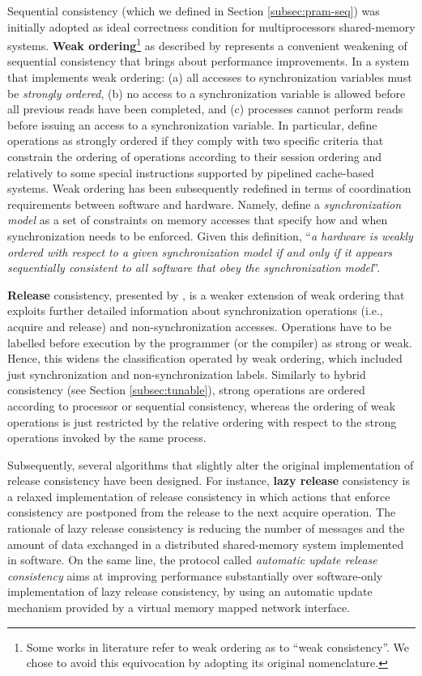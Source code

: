 \documentclass[letter, 11pt]{article}
\newcommand{\citeN}{\citet}
\renewcommand{\cite}{\citep}
\begin{document}
Sequential consistency \cite{Lamport:79} (which we defined in Section \ref{subsec:pram-seq})
was initially adopted as ideal correctness condition for multiprocessors shared-memory systems.
\textbf{Weak ordering}\footnote{Some works in literature refer to weak ordering as to ``weak consistency''. 
We chose to avoid this equivocation by adopting its original nomenclature.}
as described by \citeN{Dubois.Scheurich.ea:86} represents a convenient weakening
of sequential consistency that brings about performance improvements.
In a system that implements weak ordering: 
(a) all accesses to synchronization variables must be \emph{strongly ordered}, 
(b) no access to a synchronization variable is allowed before all previous reads have been completed, and 
(c) processes cannot perform reads before issuing an access to a 
synchronization variable.
In particular, \citeN{Dubois.Scheurich.ea:86} define operations as
strongly ordered if they comply with two specific criteria that constrain 
the ordering of operations according to their session ordering and
relatively to some special instructions supported by pipelined cache-based systems.
Weak ordering has been subsequently redefined in terms of coordination requirements between software and hardware.
Namely, \citeN{Adve.Hill:90} define a \emph{synchronization model}
as a set of constraints on memory accesses that specify how and when synchronization needs to be enforced.
Given this definition,
``\emph{a hardware is weakly ordered with respect to a given synchronization 
model if and only if it appears sequentially consistent to all software that obey the synchronization model}''.

\textbf{Release} consistency, presented by \citeN{Gharachorloo.Lenoski.ea:90}, is 
a weaker extension of weak ordering that exploits further detailed information about synchronization operations 
(i.e., acquire and release) and non-synchronization accesses.
Operations have to be labelled before execution by the programmer (or the compiler) as strong or weak. 
Hence, this widens the classification operated by weak ordering,
which included just synchronization and non-synchronization labels.
Similarly to hybrid consistency (see Section \ref{subsec:tunable}), 
strong operations are ordered according to processor or sequential consistency, 
whereas the ordering of weak operations is just restricted by the relative ordering
with respect to the strong operations invoked by the same process.

Subsequently, several algorithms that slightly alter the original implementation of release consistency
have been designed.
For instance, \textbf{lazy release} consistency \cite{Keleher.ea:92} 
is a relaxed implementation of release consistency
in which actions that enforce consistency are postponed from the release to the next acquire operation.
The rationale of lazy release consistency is reducing the number of 
messages and the amount of data exchanged in a distributed shared-memory system implemented in software.
On the same line, the protocol called \emph{automatic update release consistency} \cite{Iftode.Cezary.ea:96} 
aims at improving performance substantially over software-only implementation of lazy release consistency, 
by using an automatic update mechanism provided by a virtual memory mapped network interface.
\end{document}
